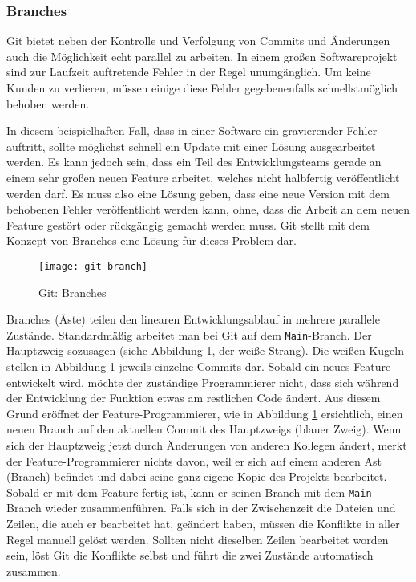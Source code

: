 \subsubsection{Branches}
Git bietet neben der Kontrolle und Verfolgung von Commits und Änderungen auch
die Möglichkeit echt parallel zu arbeiten. In einem großen Softwareprojekt sind
zur Laufzeit auftretende Fehler in der Regel unumgänglich. Um keine Kunden zu
verlieren, müssen einige diese Fehler gegebenenfalls schnellstmöglich behoben
werden.

In diesem beispielhaften Fall, dass in einer Software ein gravierender Fehler
auftritt, sollte möglichst schnell ein Update mit einer Lösung ausgearbeitet
werden. Es kann jedoch sein, dass ein Teil des Entwicklungsteams gerade an einem
sehr großen neuen Feature arbeitet, welches nicht halbfertig veröffentlicht
werden darf. Es muss also eine Lösung geben, dass eine neue Version mit dem
behobenen Fehler veröffentlicht werden kann, ohne, dass die Arbeit an dem neuen
Feature gestört oder rückgängig gemacht werden muss. Git stellt mit dem Konzept
von Branches eine Lösung für dieses Problem dar.

\begin{figure}[h]
    \centering
    \texttt{[image: git-branch]}
    \caption{Git: Branches}
    \label{fig:git-branch}
\end{figure}

Branches (Äste) teilen den linearen Entwicklungsablauf in mehrere parallele
Zustände. Standardmäßig arbeitet man bei Git auf dem \texttt{Main}-Branch. Der
Hauptzweig sozusagen (siehe Abbildung \ref{fig:git-branch}, der weiße Strang).
Die weißen Kugeln stellen in Abbildung \ref{fig:git-branch} jeweils einzelne
Commits dar. Sobald ein neues Feature entwickelt wird, möchte der zuständige
Programmierer nicht, dass sich während der Entwicklung der Funktion etwas am
restlichen Code ändert. Aus diesem Grund eröffnet der Feature-Programmierer, wie
in Abbildung \ref{fig:git-branch} ersichtlich, einen neuen Branch auf den
aktuellen Commit des Hauptzweigs (blauer Zweig). Wenn sich der Hauptzweig jetzt
durch Änderungen von anderen Kollegen ändert, merkt der Feature-Programmierer
nichts davon, weil er sich auf einem anderen Ast (Branch) befindet und dabei
seine ganz eigene Kopie des Projekts bearbeitet. Sobald er mit dem Feature
fertig ist, kann er seinen Branch mit dem \texttt{Main}-Branch wieder
zusammenführen. Falls sich in der Zwischenzeit die Dateien und Zeilen, die auch
er bearbeitet hat, geändert haben, müssen die Konflikte in aller Regel manuell
gelöst werden. Sollten nicht dieselben Zeilen bearbeitet worden sein, löst Git
die Konflikte selbst und führt die zwei Zustände automatisch zusammen.

